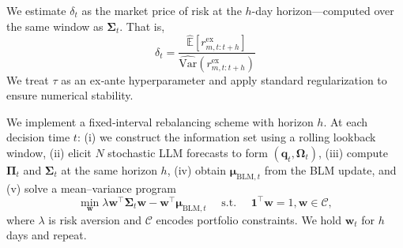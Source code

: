 We estimate $\delta_t$ as the market price of risk at the $h$-day horizon—computed over the same window as $\boldsymbol{\Sigma}_t$. That is, 
\begin{equation}
    \delta_t = \frac{\widehat{\mathbb{E}}\left[r_{m,t:t+h}^{\text{ex}}\right]}{\widehat{\mathrm{Var}}\left(r_{m,t:t+h}^{\text{ex}}\right)}
\end{equation}
We treat $\tau$ as an ex‑ante hyperparameter and apply standard regularization to ensure numerical stability.

We implement a fixed‑interval rebalancing scheme with horizon $h$. At each decision time $t$: (i) we construct the information set using a rolling lookback window, (ii) elicit $N$ stochastic LLM forecasts to form $(\mathbf{q}_t,\mathbf{\Omega}_t)$, (iii) compute $\boldsymbol{\Pi}_t$ and $\boldsymbol{\Sigma}_t$ at the same horizon $h$, (iv) obtain $\boldsymbol{\mu}_{\text{BLM},t}$ from the BLM update, and (v) solve a mean–variance program
\begin{equation}
    \min _{\mathbf{w}} \lambda \mathbf{w}^{\top} \boldsymbol{\Sigma}_t \mathbf{w} - \mathbf{w}^{\top} \boldsymbol{\mu}_{\text{BLM}, t} \quad \text { s.t. } \quad \mathbf{1}^{\top} \mathbf{w}=1, \mathbf{w} \in \mathcal{C},
\end{equation}
where $\lambda$ is risk aversion and $\mathcal{C}$ encodes portfolio constraints. We hold $\mathbf{w}_t$ for $h$ days and repeat.